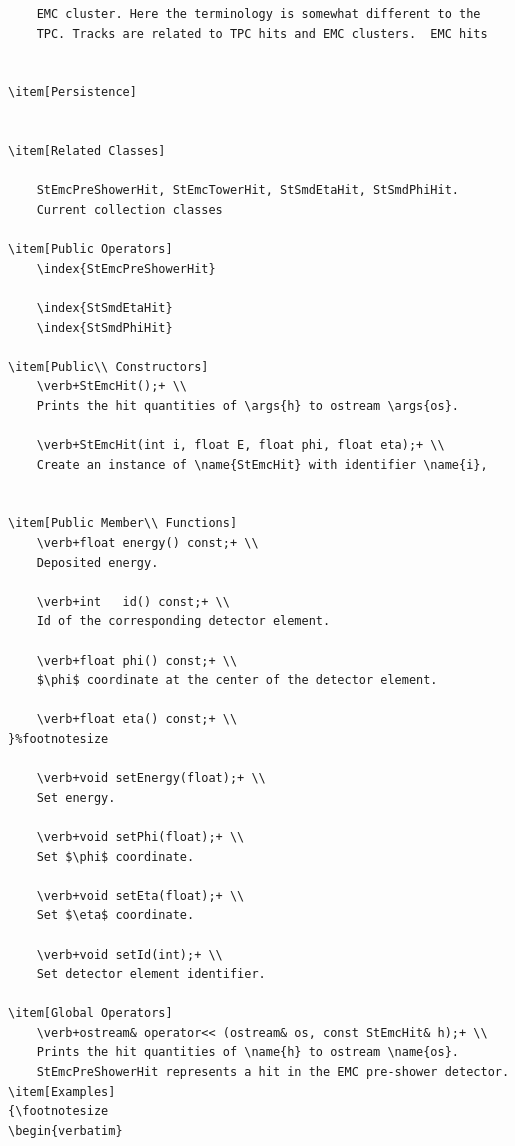 {\begin{verbatim}
    EMC cluster. Here the terminology is somewhat different to the
    TPC. Tracks are related to TPC hits and EMC clusters.  EMC hits
    

\item[Persistence]
    

\item[Related Classes]
    
    StEmcPreShowerHit, StEmcTowerHit, StSmdEtaHit, StSmdPhiHit.
    Current collection classes
    
\item[Public Operators]
    \index{StEmcPreShowerHit}
    
    \index{StSmdEtaHit}
    \index{StSmdPhiHit}
    
\item[Public\\ Constructors]
    \verb+StEmcHit();+ \\
    Prints the hit quantities of \args{h} to ostream \args{os}.

    \verb+StEmcHit(int i, float E, float phi, float eta);+ \\
    Create an instance of \name{StEmcHit} with identifier \name{i},
   

\item[Public Member\\ Functions]
    \verb+float energy() const;+ \\
    Deposited energy.

    \verb+int   id() const;+ \\
    Id of the corresponding detector element.

    \verb+float phi() const;+ \\
    $\phi$ coordinate at the center of the detector element.

    \verb+float eta() const;+ \\
}%footnotesize    

    \verb+void setEnergy(float);+ \\
    Set energy.

    \verb+void setPhi(float);+ \\
    Set $\phi$ coordinate.

    \verb+void setEta(float);+ \\
    Set $\eta$ coordinate.

    \verb+void setId(int);+ \\
    Set detector element identifier.

\item[Global Operators]
    \verb+ostream& operator<< (ostream& os, const StEmcHit& h);+ \\
    Prints the hit quantities of \name{h} to ostream \name{os}.
    StEmcPreShowerHit represents a hit in the EMC pre-shower detector.
\item[Examples]
{\footnotesize
\begin{verbatim}
    

\end{verbatim}}
